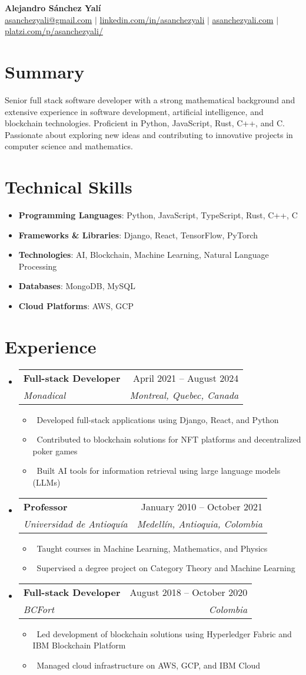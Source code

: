 \documentclass[letterpaper,10pt]{article}
\makeatletter
\newcommand{\resumeItem}[1]{\item\small{#1}}
\newcommand{\resumeSubheading}[4]{
\vspace{-1pt}\item
  \begin{tabular*}{0.97\textwidth}[t]{l@{\extracolsep{\fill}}r}
    \textbf{#1} & #2 \\
    \textit{#3} & \textit{#4} \\
  \end{tabular*}\vspace{-7pt}
}
\newcommand{\resumeSubHeadingList}{\begin{itemize}[leftmargin=0.15in, label={}]}
\newcommand{\resumeSubHeadingListEnd}{\end{itemize}}
\makeatother
\begin{document}
\begin{center}
  \textbf{\Huge Alejandro Sánchez Yalí} \\
  \small \href{mailto:asanchezyali@gmail.com}{asanchezyali@gmail.com} $|$ 
  \href{https://www.linkedin.com/in/asanchezyali}{linkedin.com/in/asanchezyali} $|$
  \href{https://asanchezyali.com}{asanchezyali.com} $|$
  \href{https://platzi.com/p/asanchezyali/}{platzi.com/p/asanchezyali/}
\end{center}

\section*{Summary}
Senior full stack software developer with a strong mathematical background and extensive experience in software development, artificial intelligence, and blockchain technologies. Proficient in Python, JavaScript, Rust, C++, and C. Passionate about exploring new ideas and contributing to innovative projects in computer science and mathematics.

\section{Technical Skills}
\resumeSubHeadingList
  \resumeItem{\textbf{Programming Languages}: Python, JavaScript, TypeScript, Rust, C++, C}
  \resumeItem{\textbf{Frameworks \& Libraries}: Django, React, TensorFlow, PyTorch}
  \resumeItem{\textbf{Technologies}: AI, Blockchain, Machine Learning, Natural Language Processing}
  \resumeItem{\textbf{Databases}: MongoDB, MySQL}
  \resumeItem{\textbf{Cloud Platforms}: AWS, GCP}
\resumeSubHeadingListEnd

\section{Experience}
\resumeSubHeadingList
  \resumeSubheading
      {Full-stack Developer}{April 2021 -- August 2024}
      {Monadical}{Montreal, Quebec, Canada}
      \resumeSubHeadingList
          \resumeItem{\textbullet\ Developed full-stack applications using Django, React, and Python}
          \resumeItem{\textbullet\ Contributed to blockchain solutions for NFT platforms and decentralized poker games}
          \resumeItem{\textbullet\ Built AI tools for information retrieval using large language models (LLMs)}
      \resumeSubHeadingListEnd
  \resumeSubheading
      {Professor}{January 2010 -- October 2021}
      {Universidad de Antioquía}{Medellín, Antioquia, Colombia}
      \resumeSubHeadingList
          \resumeItem{\textbullet\ Taught courses in Machine Learning, Mathematics, and Physics}
          \resumeItem{\textbullet\ Supervised a degree project on Category Theory and Machine Learning}
      \resumeSubHeadingListEnd
  \resumeSubheading
      {Full-stack Developer}{August 2018 -- October 2020}
      {BCFort}{Colombia}
      \resumeSubHeadingList
          \resumeItem{\textbullet\ Led development of blockchain solutions using Hyperledger Fabric and IBM Blockchain Platform}
          \resumeItem{\textbullet\ Managed cloud infrastructure on AWS, GCP, and IBM Cloud}
      \resumeSubHeadingListEnd
\resumeSubHeadingListEnd
\end{document}
